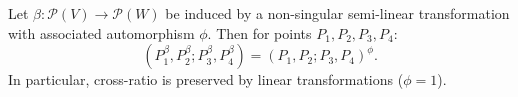 Let $\beta: \mathcal{P}(V) \to \mathcal{P}(W)$ be induced by a non-singular semi-linear transformation with associated automorphism $\phi$. Then for points $P_1, P_2, P_3, P_4$:
$$(P_1^\beta, P_2^\beta; P_3^\beta, P_4^\beta) = (P_1, P_2; P_3, P_4)^\phi.$$
In particular, cross-ratio is preserved by linear transformations ($\phi = 1$).
